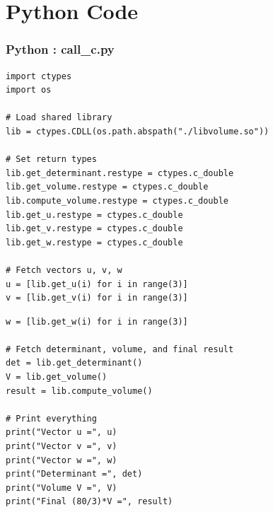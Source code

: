 \documentclass{beamer}
\theoremstyle{remark}
\numberwithin{equation}{section}
\begin{document}
\section{Python Code}
\begin{frame}[fragile]
\frametitle{Python : call\_c.py}
\begin{lstlisting}
import ctypes
import os

# Load shared library
lib = ctypes.CDLL(os.path.abspath("./libvolume.so"))

# Set return types
lib.get_determinant.restype = ctypes.c_double
lib.get_volume.restype = ctypes.c_double
lib.compute_volume.restype = ctypes.c_double
lib.get_u.restype = ctypes.c_double
lib.get_v.restype = ctypes.c_double
lib.get_w.restype = ctypes.c_double

# Fetch vectors u, v, w
u = [lib.get_u(i) for i in range(3)]
v = [lib.get_v(i) for i in range(3)]
\end{lstlisting}
\end{frame}
\begin{frame}[fragile]
\begin{lstlisting}
w = [lib.get_w(i) for i in range(3)]

# Fetch determinant, volume, and final result
det = lib.get_determinant()
V = lib.get_volume()
result = lib.compute_volume()

# Print everything
print("Vector u =", u)
print("Vector v =", v)
print("Vector w =", w)
print("Determinant =", det)
print("Volume V =", V)
print("Final (80/3)*V =", result)

\end{lstlisting}
\end{frame}
\end{document}
